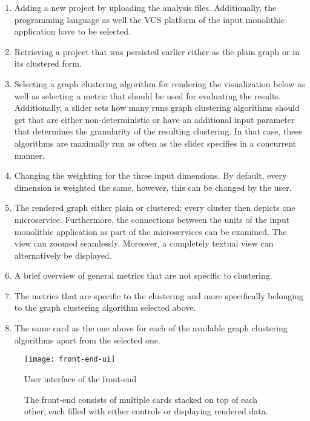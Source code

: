 \documentclass[12pt,a4paper]{report}
\begin{document}
\begin{enumerate}
  \item Adding a new project by uploading the analysis files. Additionally,
        the programming language as well the VCS platform of the input
        monolithic application have to be selected.
  \item Retrieving a project that was persisted earlier either as the plain
        graph or in its clustered form.
  \item Selecting a graph clustering algorithm for rendering the visualization
        below as well as selecting a metric that should be used for evaluating
        the results. Additionally, a slider sets how many runs graph clustering
        algorithms should get that are either non-deterministic or have an
        additional input parameter that determines the granularity of the
        resulting clustering. In that case, these algorithms are maximally run
        as often as the slider specifies in a concurrent manner.
  \item Changing the weighting for the three input dimensions. By default,
        every dimension is weighted the same, however, this can be changed by
        the user.
  \item The rendered graph either plain or clustered; every cluster then depicts
        one microservice. Furthermore, the connections between the units of the
        input monolithic application as part of the microservices can be
        examined. The view can zoomed seamlessly.
        Moreover, a completely textual view can alternatively be displayed.
  \item A brief overview of general metrics that are not specific to clustering.
  \item The metrics that are specific to the clustering and more specifically
        belonging to the graph clustering algorithm selected above.
  \item The same card as the one above for each of the available
        graph clustering algorithms apart from the selected one.
\end{enumerate}

\begin{figure}[htbp]
\centering
\texttt{[image: front-end-ui]}
\caption{User interface of the front-end}
\caption*{\centering
  The front-end consists of multiple cards stacked on top of each other,
  each filled with either controls or displaying rendered data.
}
\label{fig:front-end-ui}
\end{figure}
\end{document}
